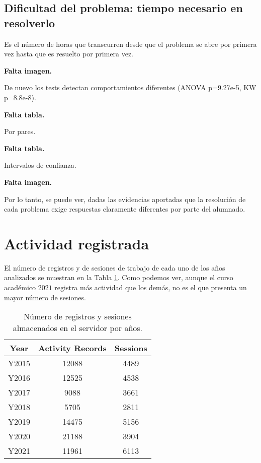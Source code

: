 
\subsection{Dificultad del problema: tiempo necesario en resolverlo}

Es el número de horas que transcurren desde que el problema se abre por primera vez hasta que es resuelto por primera vez.

\textbf{Falta imagen.}

De nuevo los tests detectan comportamientos diferentes (ANOVA p=9.27e-5, KW p=8.8e-8).

\textbf{Falta tabla.}

Por pares.

\textbf{Falta tabla.}

Intervalos de confianza.

\textbf{Falta imagen.}

Por lo tanto, se puede ver, dadas las evidencias aportadas que la resolución de cada problema exige respuestas claramente diferentes por parte del alumnado.

\section{Actividad registrada}\label{sec:activityrecorded}

El número de registros y de sesiones de trabajo de cada uno de los años analizados se muestran en la Tabla \ref{tab:records}. Como podemos ver, aunque el curso académico $2021$ registra más actividad que los demás, no es el que presenta un mayor número de sesiones.

\begin{table}[H]
\centering
\caption{Número de registros y sesiones almacenados en el servidor por años.}
\label{tab:records}
\begin{tabular}{ccc}
\hline
\textbf{Year}  & \textbf{Activity Records} & \textbf{Sessions}  \\ \hline
Y2015 & 12088            &  4489  \\
Y2016 & 12525            &  4538  \\
Y2017 & 9088             &  3661  \\
Y2018 & 5705             &  2811  \\
Y2019 & 14475            &  5156  \\
Y2020 & 21188            &  3904  \\
Y2021 & 11961            &  6113  \\ \hline
\end{tabular}
\end{table}

